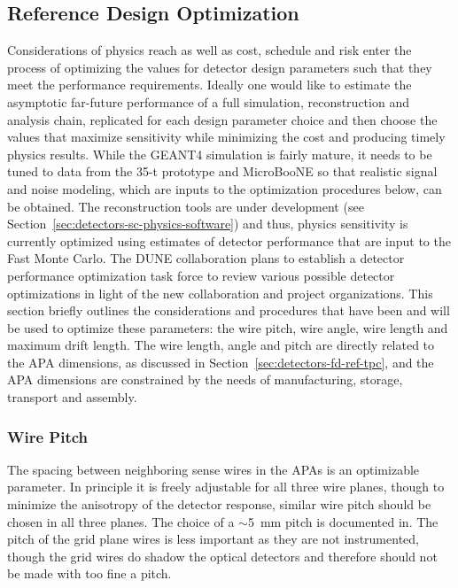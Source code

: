 \subsection{Reference Design Optimization}
\label{sec:detectors-fd-ref-optimization}

Considerations of physics reach as well as
cost, schedule and risk enter the process of optimizing the values for
detector design parameters such that they meet the performance requirements. 
Ideally one would like to estimate the
asymptotic far-future performance of a full simulation, reconstruction
and analysis chain, replicated for each design parameter choice and
then choose the values that maximize sensitivity while minimizing the
cost and producing timely physics results. While the GEANT4 simulation
is fairly mature, it needs to be tuned to data from the 35-t prototype
and MicroBooNE so that realistic signal and noise modeling, which are
inputs to the optimization procedures below, can be obtained. 
The
reconstruction tools are under development (see
Section~\ref{sec:detectors-sc-physics-software}) and thus, physics
sensitivity is currently optimized using estimates of detector
performance that are input to the Fast Monte Carlo. The DUNE
collaboration plans to establish a detector performance optimization
task force to review various possible detector optimizations in light
of the new collaboration and project organizations.  This section
briefly outlines the considerations and procedures that have been and
will be used to optimize these parameters: the wire pitch, wire
angle, wire length and  maximum drift length.  The 
wire length, angle and pitch are directly related to the
APA dimensions, as discussed in
Section~\ref{sec:detectors-fd-ref-tpc}, and the APA dimensions are
constrained by the needs of manufacturing, storage, transport and
assembly.

\subsubsection{Wire Pitch}

The spacing between neighboring sense wires in the APAs is an
optimizable parameter.  In principle it is freely adjustable for all
three wire planes, though to minimize the anisotropy of the detector
response, similar wire pitch should be chosen in all three planes.
The choice of a $\sim$5~mm pitch is documented in\cite{docdb-3407}.  
The pitch of the grid plane wires is less
important as they are not instrumented, though the grid wires do
shadow the optical detectors and therefore should not be made with too fine a pitch.


